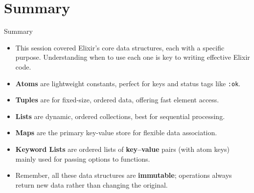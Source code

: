 \documentclass[aspectratio=169, table]{beamer}
\begin{document}
\section{Summary}
\begin{frame}{Summary}
\vspace{20pt}
\begin{itemize}
\item This session covered Elixir's core data structures, each with a specific purpose. Understanding when to use each one is key to writing effective Elixir code.
    \item \textbf{Atoms} are lightweight constants, perfect for keys and status tags like \texttt{:ok}.
    \item \textbf{Tuples} are for fixed-size, ordered data, offering fast element access.
    \item \textbf{Lists} are dynamic, ordered collections, best for sequential processing.
    \item \textbf{Maps} are the primary key-value store for flexible data association.
    \item \textbf{Keyword Lists} are ordered lists of \textbf{key--value} pairs (with atom keys) mainly used for passing options to functions.  
\item Remember, all these data structures are \textbf{immutable}; operations always return new data rather than changing the original.
\end{itemize}
\end{frame}
\end{document}
